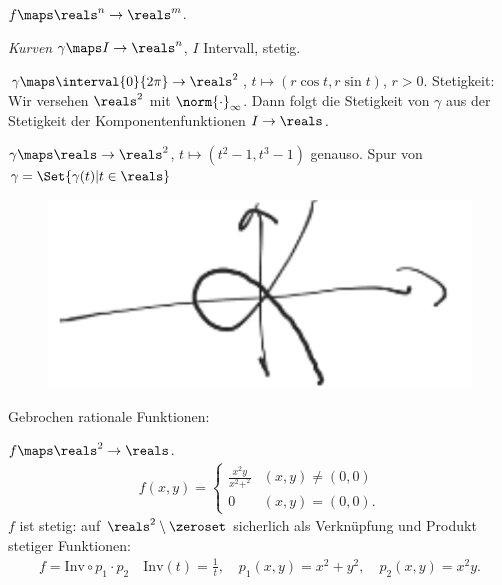 \begin{beispiele}
    \( f\maps \reals^n\to \reals^m \).
    \begin{eigenschaftenenumerate}
        \item \emph{Kurven} \( \gamma\maps I\to \reals^n \), \( I \) Intervall, stetig.
        \begin{beispiele*}
            \item \( \gamma\maps \interval{0}{2\pi}\to \reals^2 \), \( t\mapsto (r \cos t, r \sin t) \), \( r>0 \).
            Stetigkeit: Wir versehen \( \reals^2 \) mit \( \norm{\cdot}_{\infty} \).
            Dann folgt die Stetigkeit von \( \gamma \) aus der Stetigkeit der Komponentenfunktionen \( I\to \reals \).
            \item \( \gamma\maps \reals\to \reals^2 \), \( t\mapsto (t^2-1,t^3-1) \) genauso.
            Spur von \( \gamma=\Set{\gamma(t)|t\in \reals} \)
            \begin{figure}[H]
                \centering
                \includegraphics[width=0.5\linewidth]{figures/komponentenstetigkeit_beispiel_hoch_2_gegen_hoch_3}
                \label{fig:komponentenstetigkeit_beispiel_hoch_2_gegen_hoch_3}
            \end{figure}
        \end{beispiele*}
        \item\label{stetigkeit:beispiel:gebrochen_rationale_funktionen} Gebrochen rationale Funktionen:
        \begin{beispiele*}
            \item \( f\maps \reals^2\to \reals \).
            \begin{align*}
                f(x,y)=\begin{cases}
                    \frac{x^2y}{x^2+^2}&(x,y)\neq (0,0)\\
                    0&(x,y)=(0,0).
                \end{cases}                
            \end{align*}
            \( f \) ist stetig: auf \( \reals^2\setminus \zeroset \) sicherlich als Verknüpfung und Produkt stetiger Funktionen:
            \begin{align*}
                f=\text{Inv}\circ p_1\cdot p_2\quad \text{Inv}(t)=\frac{1}{t},\quad p_1(x,y)=x^2+y^2,\quad p_2(x,y)=x^2y.

\end{align*}
\end{beispiele*}
\end{eigenschaftenenumerate}
\end{beispiele}
